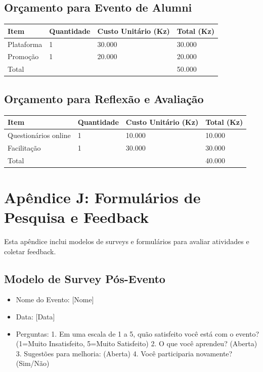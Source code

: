 \documentclass[12pt]{article}
\begin{document}
\subsection{Orçamento para Evento de Alumni}
\begin{longtable}{|l|l|l|l|}
\hline
Item & Quantidade & Custo Unitário (Kz) & Total (Kz) \\
\hline
Plataforma & 1 & 30.000 & 30.000 \\
Promoção & 1 & 20.000 & 20.000 \\
\hline
Total & & & 50.000 \\
\hline
\end{longtable}

\subsection{Orçamento para Reflexão e Avaliação}
\begin{longtable}{|l|l|l|l|}
\hline
Item & Quantidade & Custo Unitário (Kz) & Total (Kz) \\
\hline
Questionários online & 1 & 10.000 & 10.000 \\
Facilitação & 1 & 30.000 & 30.000 \\
\hline
Total & & & 40.000 \\
\hline
\end{longtable}

\section{Apêndice J: Formulários de Pesquisa e Feedback}

Esta apêndice inclui modelos de surveys e formulários para avaliar atividades e coletar feedback.

\subsection{Modelo de Survey Pós-Evento}
\begin{itemize}
    \item Nome do Evento: [Nome]
    \item Data: [Data]
    \item Perguntas:
      1. Em uma escala de 1 a 5, quão satisfeito você está com o evento? (1=Muito Insatisfeito, 5=Muito Satisfeito)
      2. O que você aprendeu? (Aberta)
      3. Sugestões para melhoria: (Aberta)
      4. Você participaria novamente? (Sim/Não)
\end{itemize}
\end{document}
